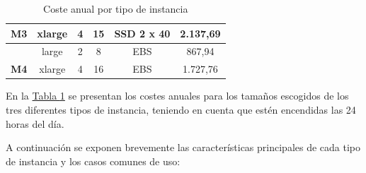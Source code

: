 \begin{table}
\begin{center}
\begin{tabular}{cccccc}
\multicolumn{1}{|c|}{\multirow{-3}{*}{\cellcolor[HTML]{EFEFEF}\textbf{M3}}} & \multicolumn{1}{c|}{xlarge}                                  & \multicolumn{1}{c|}{4}                                    & \multicolumn{1}{c|}{15}                                                                                     & \multicolumn{1}{c|}{SSD 2 x 40}                                                                                       & \multicolumn{1}{c|}{2.137,69}                                                                           \\ \hline
\multicolumn{1}{|c|}{\cellcolor[HTML]{EFEFEF}}                              & \multicolumn{1}{c|}{large}                                   & \multicolumn{1}{c|}{2}                                    & \multicolumn{1}{c|}{8}                                                                                      & \multicolumn{1}{c|}{EBS}                                                                                          & \multicolumn{1}{c|}{867,94}                                                                             \\ \cline{2-6} 
\multicolumn{1}{|c|}{\multirow{-2}{*}{\cellcolor[HTML]{EFEFEF}\textbf{M4}}} & \multicolumn{1}{c|}{xlarge}                                  & \multicolumn{1}{c|}{4}                                    & \multicolumn{1}{c|}{16}                                                                                     & \multicolumn{1}{c|}{EBS}                                                                                          & \multicolumn{1}{c|}{1.727,76}                                                                           \\ \hline
                                                                          
\end{tabular}
\caption{Coste anual por tipo de instancia \label{tab:costeinstancia}}
\end{center}
\end{table}


En la \hyperref[tab:costeinstancia]{Tabla \ref{tab:costeinstancia}} se presentan los costes anuales para los tamaños escogidos de los tres diferentes tipos de instancia, teniendo en cuenta que estén encendidas las 24 horas del día.

A continuación se exponen brevemente las características principales de cada tipo de instancia y los casos comunes de uso:

